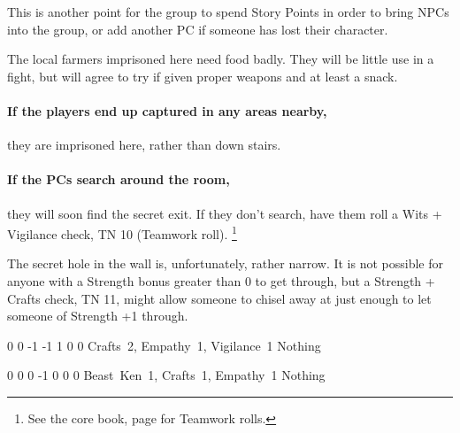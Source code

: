 \begin{multicols}{2}
This is another point for the group to spend Story Points in order to bring NPCs into the group, or add another PC if someone has lost their character.

The local farmers imprisoned here need food badly.
They will be little use in a fight, but will agree to try if given proper weapons and at least a snack.

\paragraph{If the players end up captured in any areas nearby,}
they are imprisoned here, rather than down stairs.

\paragraph{If the PCs search around the room,}
they will soon find the secret exit.
If they don't search, have them roll a Wits + Vigilance check, TN 10 (Teamwork roll).%
\footnote{See the core book, page \pageref{teamwork} for Teamwork rolls.}

The secret hole in the wall is, unfortunately, rather narrow.
It is not possible for anyone with a Strength bonus greater than 0 to get through, but a Strength + Crafts check, TN 11, might allow someone to chisel away at just enough to let someone of Strength +1 through.

{0}%
{0}%
{{-1}%
{-1}%
{1}}%
{0}%
{0}%
{Crafts~2, Empathy~1, Vigilance~1}%
{Nothing}%
{}

{0}%
{0}%
{{0}%
{-1}%
{0}}%
{0}%
{0}%
{Beast~Ken~1, Crafts~1, Empathy~1}%
{Nothing}%
{}

\end{multicols}

